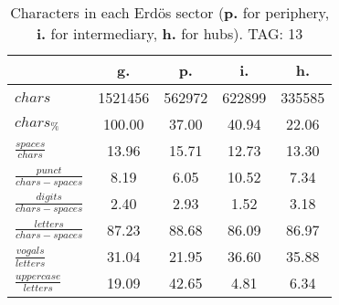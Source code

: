 \begin{table}[h!]
\begin{center}
\begin{tabular}{| l || c | c | c | c |}\hline
 & {\bf g.} & {\bf p.} & {\bf i.} & {\bf h.} \\\hline\hline
$chars$ & 1521456  & 562972  & 622899  & 335585 \\
$chars_{\%}$ & 100.00  & 37.00  & 40.94  & 22.06 \\\hline
$\frac{spaces}{chars}$ & 13.96  & 15.71  & 12.73  & 13.30 \\
$\frac{punct}{chars-spaces}$ & 8.19  & 6.05  & 10.52  & 7.34 \\
$\frac{digits}{chars-spaces}$ & 2.40  & 2.93  & 1.52  & 3.18 \\\hline
$\frac{letters}{chars-spaces}$ & 87.23  & 88.68  & 86.09  & 86.97 \\
$\frac{vogals}{letters}$ & 31.04  & 21.95  & 36.60  & 35.88 \\
$\frac{uppercase}{letters}$ & 19.09  & 42.65  & 4.81  & 6.34 \\\hline
\end{tabular}
\caption{Characters in each Erd\"os sector ({{\bf p.}} for periphery, {{\bf i.}} for intermediary, 
    {{\bf h.}} for hubs). TAG: 13}
\end{center}
\end{table}